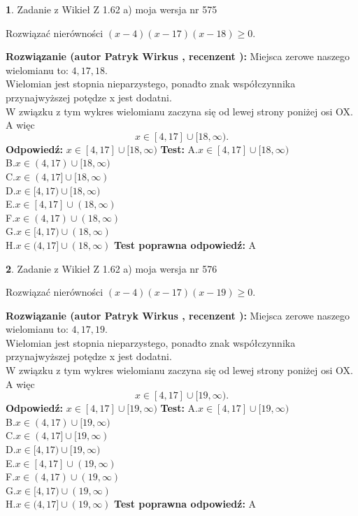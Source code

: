 \documentclass[12pt, a4paper]{article}
\theoremstyle{definition} %
\newtheorem{zad}{}
\newcommand{\zadStart}[1]{\begin{zad}#1\newline}
\newcommand{\zadStop}{\end{zad}}
\newcommand{\rozwStart}[2]{\noindent \textbf{Rozwiązanie (autor #1 , recenzent #2): }\newline}
\newcommand{\rozwStop}{\newline}
\newcommand{\odpStart}{\noindent \textbf{Odpowiedź:}\newline}
\newcommand{\odpStop}{\newline}
\newcommand{\testStart}{\noindent \textbf{Test:}\newline}
\newcommand{\testStop}{\newline}
\newcommand{\kluczStart}{\noindent \textbf{Test poprawna odpowiedź:}\newline}
\newcommand{\kluczStop}{\newline}
\begin{document}
\zadStart{Zadanie z Wikieł Z 1.62 a) moja wersja nr 575}

Rozwiązać nierówności $(x-4)(x-17)(x-18)\ge0$.
\zadStop
\rozwStart{Patryk Wirkus}{}
Miejsca zerowe naszego wielomianu to: $4, 17, 18$.\\
Wielomian jest stopnia nieparzystego, ponadto znak współczynnika przy\linebreak najwyższej potędze x jest dodatni.\\ W związku z tym wykres wielomianu zaczyna się od lewej strony poniżej osi OX. A więc $$x \in [4,17] \cup [18,\infty).$$
\rozwStop
\odpStart
$x \in [4,17] \cup [18,\infty)$
\odpStop
\testStart
A.$x \in [4,17] \cup [18,\infty)$\\
B.$x \in (4,17) \cup [18,\infty)$\\
C.$x \in (4,17] \cup [18,\infty)$\\
D.$x \in [4,17) \cup [18,\infty)$\\
E.$x \in [4,17] \cup (18,\infty)$\\
F.$x \in (4,17) \cup (18,\infty)$\\
G.$x \in [4,17) \cup (18,\infty)$\\
H.$x \in (4,17] \cup (18,\infty)$
\testStop
\kluczStart
A
\kluczStop



\zadStart{Zadanie z Wikieł Z 1.62 a) moja wersja nr 576}

Rozwiązać nierówności $(x-4)(x-17)(x-19)\ge0$.
\zadStop
\rozwStart{Patryk Wirkus}{}
Miejsca zerowe naszego wielomianu to: $4, 17, 19$.\\
Wielomian jest stopnia nieparzystego, ponadto znak współczynnika przy\linebreak najwyższej potędze x jest dodatni.\\ W związku z tym wykres wielomianu zaczyna się od lewej strony poniżej osi OX. A więc $$x \in [4,17] \cup [19,\infty).$$
\rozwStop
\odpStart
$x \in [4,17] \cup [19,\infty)$
\odpStop
\testStart
A.$x \in [4,17] \cup [19,\infty)$\\
B.$x \in (4,17) \cup [19,\infty)$\\
C.$x \in (4,17] \cup [19,\infty)$\\
D.$x \in [4,17) \cup [19,\infty)$\\
E.$x \in [4,17] \cup (19,\infty)$\\
F.$x \in (4,17) \cup (19,\infty)$\\
G.$x \in [4,17) \cup (19,\infty)$\\
H.$x \in (4,17] \cup (19,\infty)$
\testStop
\kluczStart
A
\kluczStop
\end{document}
